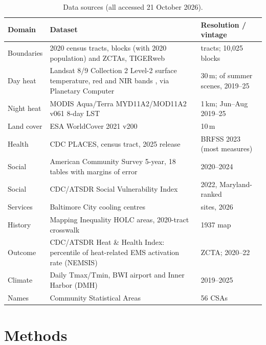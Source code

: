 \documentclass[11pt]{article}
\begin{document}
\begin{table}[ht]\centering\small
\caption{Data sources (all accessed 21 October 2026).}\label{tab:data}
\begin{tabularx}{\textwidth}{@{}l X l@{}}\toprule
Domain & Dataset & Resolution / vintage \\\midrule
Boundaries & 2020 census tracts, blocks (with 2020 population) and ZCTAs, TIGERweb \citep{tigerweb} & \NTracts{} tracts; 10,025 blocks \\
Day heat & Landsat 8/9 Collection 2 Level-2 surface temperature, red and NIR bands \citep{usgs_l89}, via Planetary Computer \citep{pc} & 30\,m; \NScenesUsed{} of \NScenes{} summer scenes, 2019--25 \\
Night heat & MODIS Aqua/Terra MYD11A2/MOD11A2 v061 8-day LST \citep{myd11a2} & 1\,km; Jun--Aug 2019--25 \\
Land cover & ESA WorldCover 2021 v200 \citep{worldcover} & 10\,m \\
Health & CDC PLACES, census tract, 2025 release \citep{places2025,zhang2014,zhang2015} & BRFSS 2023 (most measures) \\
Social & American Community Survey 5-year, 18 tables with margins of error \citep{acs2024} & 2020--2024 \\
Social & CDC/ATSDR Social Vulnerability Index \citep{flanagan2011,svi2022} & 2022, Maryland-ranked \\
Services & Baltimore City cooling centres \citep{baltcool} & \NCool{} sites, 2026 \\
History & Mapping Inequality HOLC areas, 2020-tract crosswalk \citep{mappingineq} & 1937 map \\
Outcome & CDC/ATSDR Heat \& Health Index: percentile of heat-related EMS activation rate (NEMSIS) \citep{hhi2024} & ZCTA; 2020--22 \\
Climate & Daily Tmax/Tmin, BWI airport and Inner Harbor (DMH) \citep{acis} & 2019--2025 \\
Names & Community Statistical Areas \citep{bnia} & 56 CSAs \\\bottomrule
\end{tabularx}
\end{table}

\section{Methods}
\end{document}
